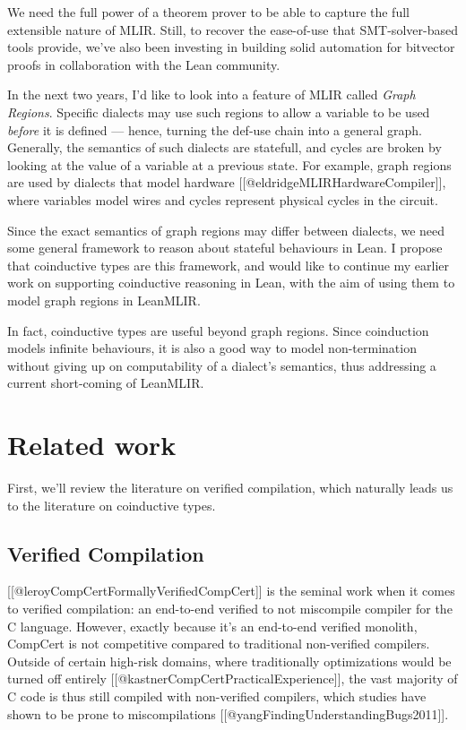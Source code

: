 \documentclass[a4paper]{article}
\begin{document}
We need the full power of a theorem prover to be able to capture the
full extensible nature of MLIR. Still, to recover the ease-of-use that
SMT-solver-based tools provide, we've also been investing in building
solid automation for bitvector proofs in collaboration with the Lean
community.

In the next two years, I'd like to look into a feature of MLIR called
\emph{Graph Regions}. Specific dialects may use such regions to allow a
variable to be used \emph{before} it is defined --- hence, turning the
def-use chain into a general graph. Generally, the semantics of such
dialects are statefull, and cycles are broken by looking at the value of
a variable at a previous state. For example, graph regions are used by
dialects that model hardware {[}{[}@eldridgeMLIRHardwareCompiler{]}{]},
where variables model wires and cycles represent physical cycles in the
circuit.

Since the exact semantics of graph regions may differ between dialects,
we need some general framework to reason about stateful behaviours in
Lean. I propose that coinductive types are this framework, and would
like to continue my earlier work on supporting coinductive reasoning in
Lean, with the aim of using them to model graph regions in LeanMLIR.

In fact, coinductive types are useful beyond graph regions. Since
coinduction models infinite behaviours, it is also a good way to model
non-termination without giving up on computability of a dialect's
semantics, thus addressing a current short-coming of LeanMLIR.

\hypertarget{related-work}{%
\section{Related work}\label{related-work}}

First, we'll review the literature on verified compilation, which
naturally leads us to the literature on coinductive types.

\hypertarget{verified-compilation}{%
\subsection{Verified Compilation}\label{verified-compilation}}

{[}{[}@leroyCompCertFormallyVerified\textbar CompCert{]}{]} is the
seminal work when it comes to verified compilation: an end-to-end
verified to not miscompile compiler for the C language. However, exactly
because it's an end-to-end verified monolith, CompCert is not
competitive compared to traditional non-verified compilers. Outside of
certain high-risk domains, where traditionally optimizations would be
turned off entirely {[}{[}@kastnerCompCertPracticalExperience{]}{]}, the
vast majority of C code is thus still compiled with non-verified
compilers, which studies have shown to be prone to miscompilations
{[}{[}@yangFindingUnderstandingBugs2011{]}{]}.
\end{document}
